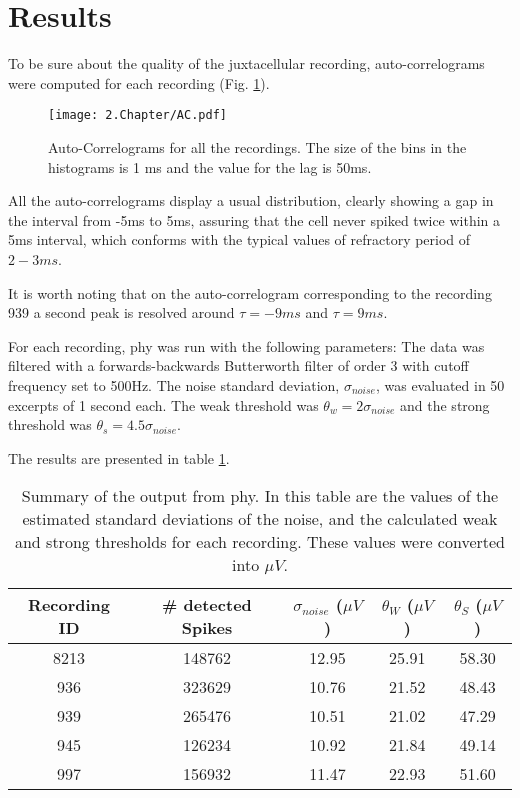
\section{Results}
\label{sec:chap2-results}
To be sure about the quality of the juxtacellular recording, auto-correlograms were computed for each recording (Fig. \ref{fig:AC}).
\begin{figure}[!h]
	\centering
	\texttt{[image: 2.Chapter/AC.pdf]}
	\caption{Auto-Correlograms for all the recordings. The size of the bins in the histograms is 1 ms and the value for the lag is 50ms.
}
\label{fig:AC}
\end{figure}

All the auto-correlograms display a usual distribution, clearly showing a gap in the interval from -5ms to 5ms, assuring that the cell never spiked twice  within a 5ms interval, which conforms with the typical values of refractory period of $2-3ms$.

It is worth noting that on the auto-correlogram corresponding to the recording 939 a second peak is resolved around $\tau = -9 ms$ and $\tau = 9 ms$.

For each recording, phy was run with the following parameters:
The data was filtered with a forwards-backwards Butterworth filter of order 3 with cutoff frequency set to 500Hz. The noise standard deviation, $\sigma_{noise}$, was evaluated in 50 excerpts of 1 second each. The weak threshold was $\theta_w = 2 \sigma_{noise}$ and the strong threshold was $\theta_s = 4.5 \sigma_{noise}$.

The results are presented in table \ref{tab:results-from-phy}.

\begin{table}[!h]

\begin{center}
\begin{tabular}{ccccc}
Recording ID & \# detected Spikes & $\sigma_{noise}$ ($\mu V$) & $\theta_W$ ($\mu V$) & $\theta_S$ ($\mu V$) \\ \hline
8213 & 148762 &  12.95 & 25.91 & 58.30 \\ 
936 & 323629 & 10.76 & 21.52 & 48.43 \\ 
939 & 265476 & 10.51 & 21.02 & 47.29 \\ 
945 & 126234 & 10.92 & 21.84 & 49.14 \\ 
997 & 156932 & 11.47 & 22.93 & 51.60 \\ 
\end{tabular}
\end{center}
\caption{Summary of the output from phy. In this table are the values of the estimated standard deviations of the noise, and the calculated weak and strong thresholds for each recording. These values were converted into $\mu V$.}
\label{tab:results-from-phy}
\end{table}


